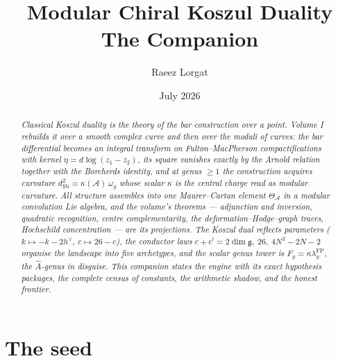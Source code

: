 \documentclass[11pt]{article}
\title{\bfseries Modular Chiral Koszul Duality\\[0.4em]
\Large The Companion}
\author{Raeez Lorgat}
\date{July 2026}
\providecommand{\cA}{\mathcal{A}}
\providecommand{\fg}{\mathfrak{g}}
\begin{document}
\maketitle

\begin{abstract}
\noindent\itshape
Classical Koszul duality is the theory of the bar construction over a
point. Volume I rebuilds it over a smooth complex curve and then over
the moduli of curves: the bar differential becomes an integral
transform on Fulton--MacPherson compactifications with kernel
$\eta=d\log(z_1-z_2)$, its square vanishes exactly by the Arnold
relation together with the Borcherds identity, and at genus $\ge1$
the construction acquires curvature
$d^2_{\mathrm{fib}}=\kappa(\cA)\,\omega_g$ whose scalar $\kappa$ is
the central charge read as modular curvature. All structure assembles
into one Maurer--Cartan element $\Theta_\cA$ in a modular convolution
Lie algebra, and the volume's theorems --- adjunction and inversion,
quadratic recognition, centre complementarity, the
deformation--Hodge--graph traces, Hochschild concentration --- are
its projections. The Koszul dual reflects parameters
($k\mapsto-k-2h^\vee$, $c\mapsto26-c$), the conductor laws
$c+c^!=2\dim\fg,\ 26,\ 4N^3-2N-2$ organise the landscape into five
archetypes, and the scalar genus tower is
$F_g=\kappa\lambda_g^{\mathrm{FP}}$, the $\widehat A$-genus in
disguise. This companion states the engine with its exact hypothesis
packages, the complete census of constants, the arithmetic shadow,
and the honest frontier.
\end{abstract}

\section{The seed}\label{sec:seed}
\end{document}
